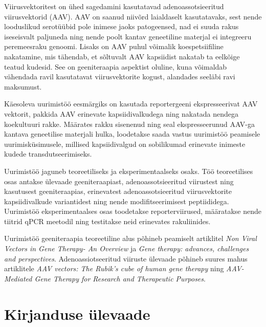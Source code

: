 \documentclass{trkut}%
\begin{document}
Viirusvektoritest on ühed sagedamini kasutatavad adenoassotsieeritud viirusvektorid (AAV). AAV on saanud niivõrd laialdaselt kasutatavaks, sest nende looduslikud serotüübid pole inimese jaoks patogeensed, nad ei suuda rakus iseseisvalt paljuneda ning nende poolt kantav geneetiline materjal ei integreeru peremeesraku genoomi. Lisaks on AAV puhul võimalik koespetsiifiline nakatamine, mis tähendab, et sõltuvalt AAV kapsiidist nakatab ta eelkõige teatud kudesid. See on geeniteraapia aspektist oluline, kuna võimaldab vähendada ravil kasutatavat viirusvektorite kogust, alandades seeläbi ravi maksumust.

Käesoleva uurimistöö eesmärgiks on kasutada reportergeeni ekspresseerivat AAV vektorit, pakkida AAV erinevate kapsiidivalkudega ning nakatada nendega koekultuuri rakke. Määrates rakku sisenenud ning seal ekspresseerunud AAV-ga kantava geneetilise materjali hulka, loodetakse saada vastus uurimistöö peamisele uurimisküsimusele, millised kapsiidivalgud on sobilikumad erinevate inimeste kudede transdutseerimiseks.

Uurimistöö jaguneb teoreetiliseks ja eksperimentaalseks osaks. Töö teoreetilises osas antakse ülevaade geeniteraapiast, adenoassotsieeritud viirustest ning kasutusest geeniteraapias, erinevatest adenoassotsieeritud viirusvektorite kapsiidivalkude variantidest ning nende modifitseerimisest peptiididega. Uurimistöö eksperimentaalses osas toodetakse reporterviirused, määratakse nende tiitrid qPCR meetodil ning testitakse neid erinevates rakuliinides.

\begin{comment}
transdutseeritakse koekultuuri rakke adenoassotsieeritud viirusvektoritega, mille kapsiide on modifitseeritud erinevate peptiidega. Rakkude inkubeerimisel Luc-2 substraati D-lutsiferiini sisaldavas puhvris ja eraldunud valgusvoo hulga määramisel luminomeetriga mõõdetakse reportergeeni jaanimardika lutsiferaasi ekspressiooni aktiivsust.
\end{comment}

Uurimistöö geeniteraapia teoreetiline alus põhineb peamiselt artiklitel \textit{Non Viral Vectors in Gene Therapy- An Overview} ja \textit{Gene therapy: advances, challenges and perspectives}. Adenoassiotseeritud viiruste ülevaade põhineb suures mahus artiklitele \textit{AAV vectors: The Rubik’s cube of human gene therapy} ning \textit{AAV-Mediated Gene Therapy for Research and Therapeutic Purposes}.

\chapter{Kirjanduse ülevaade}
\end{document}
